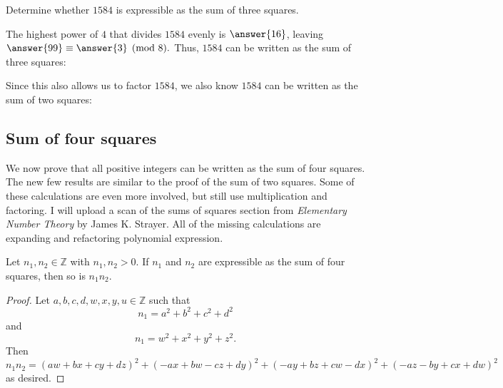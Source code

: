 \documentclass{ximera}
\begin{document}
\begin{example}
 Determine whether $1584$ is expressible as the sum of three squares. 
 
 The highest power of $4$ that divides $1584$ evenly is $\answer{16}$, leaving $\answer{99}\equiv\answer{3} \pmod 8.$ Thus, $1584$ can be written as the sum of three squares:
\begin{multipleChoice}
\end{multipleChoice}

Since this also allows us to factor $1584$, we  also know $1584$ can be written as the sum of two squares:
\begin{multipleChoice}
\end{multipleChoice}
\end{example}

\subsection{Sum of four squares}
We now prove that all positive integers can be written as the sum of four squares. The new few results are similar to the proof of the sum of two squares. Some of these calculations are even more involved, but still use multiplication and factoring. I will upload a scan of the sums of squares section from \emph{Elementary Number Theory} by James K. Strayer. All of the missing calculations are expanding and refactoring polynomial expression. 

\begin{theorem}[Euler]
 Let $n_1,n_2\in\mathbb{Z}$ with $n_1,n_2>0$. If $n_1$ and $n_2$ are expressible as the sum of four squares, then so is $n_1n_2$. 
\end{theorem}
\begin{proof}
 Let $a,b,c,d,w,x,y,u\in\mathbb{Z}$ such that \[n_1=a^2+b^2+c^2+d^2\] and \[n_1=w^2+x^2+y^2+z^2.\]  Then \[n_1n_2=(aw+bx+cy+dz)^2+(-ax+bw-cz+dy)^2+(-ay+bz+cw-dx)^2+(-az-by+cx+dw)^2 \] as desired.
\end{proof}
\end{document}
